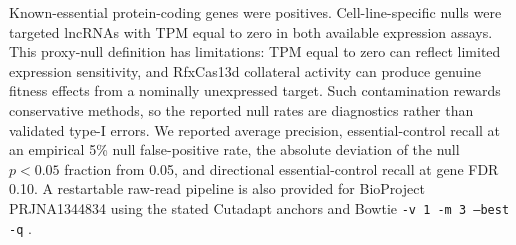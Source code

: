 Known-essential protein-coding genes were positives.  Cell-line-specific nulls
were targeted lncRNAs with TPM equal to zero in both available expression
assays.  This proxy-null definition has limitations: TPM equal to zero can
reflect limited expression sensitivity, and RfxCas13d collateral activity can
produce genuine fitness effects from a nominally unexpressed target.  Such
contamination rewards conservative methods, so the reported null rates are
diagnostics rather than validated type-I errors.  We reported average
precision, essential-control recall at an empirical 5\% null false-positive
rate, the absolute deviation of the null $p<0.05$ fraction from 0.05, and
directional essential-control recall at gene FDR 0.10.  A restartable raw-read
pipeline is also provided for BioProject PRJNA1344834 using the stated
Cutadapt anchors \citep{martin2011cutadapt} and Bowtie \texttt{-v 1 -m 3
--best -q} \citep{langmead2009bowtie}.
